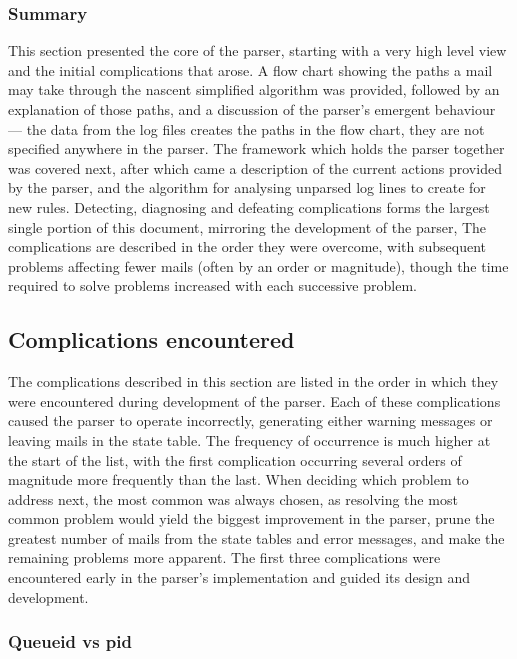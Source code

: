 \subsubsection{Summary}

This section presented the core of the parser, starting with a very high
level view and the initial complications that arose.  A flow chart showing
the paths a mail may take through the nascent simplified algorithm was
provided, followed by an explanation of those paths, and a discussion of
the parser's emergent behaviour --- the data from the log files creates the
paths in the flow chart, they are not specified anywhere in the parser.
The framework which holds the parser together was covered next, after which
came a description of the current actions provided by the parser, and the
algorithm for analysing unparsed log lines to create \regexes{} for new
rules.  Detecting, diagnosing and defeating complications forms the largest
single portion of this document, mirroring the development of the parser,
The complications are described in the order they were overcome, with
subsequent problems affecting fewer mails (often by an order or magnitude),
though the time required to solve problems increased with each successive
problem.


\subsection{Complications encountered}

\label{additional complications}
\label{complications}


The complications described in this section are listed in the order in
which they were encountered during development of the parser.  Each of
these complications caused the parser to operate incorrectly, generating
either warning messages or leaving mails in the state table.  The frequency
of occurrence is much higher at the start of the list, with the first
complication occurring several orders of magnitude more frequently than the
last.  When deciding which problem to address next, the most common was
always chosen, as resolving the most common problem would yield the biggest
improvement in the parser, prune the greatest number of mails from the
state tables and error messages, and make the remaining problems more
apparent.  The first three complications were encountered early in the
parser's implementation and guided its design and development.

\subsubsection{Queueid vs pid}

